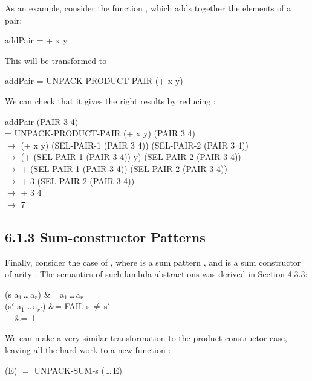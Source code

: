 As an example, consider the function , which adds together the
elements of a pair:
\begin{mlcoded}
	addPair =  + x y
\end{mlcoded}
This will be transformed to
\begin{mlcoded}
	addPair = UNPACK-PRODUCT-PAIR (+ x y)
\end{mlcoded}
We can check that it gives the right results by reducing :
\begin{mlcoded}
	addPair (PAIR 3 4)\\
	\phantom{--}= UNPACK-PRODUCT-PAIR (+ x y) (PAIR 3 4) \\
	$\rightarrow$ (+ x y) (SEL-PAIR-1 (PAIR 3 4)) (SEL-PAIR-2 (PAIR 3 4)) \\
	$\rightarrow$ (+ (SEL-PAIR-1 (PAIR 3 4)) y) (SEL-PAIR-2 (PAIR 3 4)) \\
	$\rightarrow$ + (SEL-PAIR-1 (PAIR 3 4)) (SEL-PAIR-2 (PAIR 3 4)) \\
	$\rightarrow$ + 3 (SEL-PAIR-2 (PAIR 3 4)) \\
	$\rightarrow$ + 3 4 \\
	$\rightarrow$ 7
\end{mlcoded}

\subsection{6.1.3 Sum-constructor Patterns}

Finally, consider the case of , where  is a sum pattern , and
 is a sum constructor of arity . The semantics of such lambda abstractions
was derived in Section 4.3.3:
\begin{letalign}
	 (s a$_1$\,\ldots\,a$_r$)
	&=  a$_1$\,\ldots\,a$_r$ \\
	 (s$'$ a$_1$\,\ldots\,a$_{r'}$)
	&= FAIL  s$\,\neq\,$s$'$ \\
	 $\bot$
	&= $\bot$ \\
\end{letalign}


We can make a very similar transformation to the product-constructor case,
leaving all the hard work to a new function :
\begin{mlcoded}
	(E) $=$ UNPACK-SUM-s (\,\ldots\,E)
\end{mlcoded}

